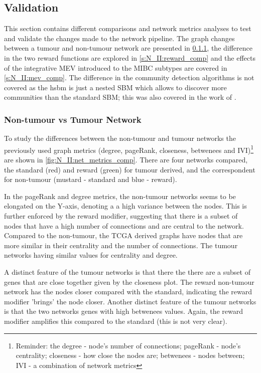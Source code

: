\subsection{Validation} \label{s:N_II:validation}


This section contains different comparisons and network metrics analyses to test and validate the changes made to the network pipeline. The graph changes between a tumour and non-tumour network are presented in \cref{s:N_II:net_comp}, the difference in the two reward functions are explored in \cref{s:N_II:reward_comp} and the effects of the integrative MEV introduced to the MIBC subtypes are covered in \cref{s:N_II:mev_comp}. The difference in the community detection algorithms is not covered as the \acrfull{hsbm} is just a nested SBM which allows to discover more communities than the standard SBM; this was also covered in the work of \citet{Peixoto2014-yb}.


\subsubsection{Non-tumour vs Tumour Network} \label{s:N_II:net_comp}

To study the differences between the non-tumour and tumour networks the previously used graph metrics (degree, pageRank, closeness, betwenees and IVI)\footnote{Reminder: the degree - node's number of connections; pageRank - node's centrality; closeness - how close the nodes are; betwenees - nodes between; IVI - a combination of network metrics} are shown in \cref{fig:N_II:net_metrics_comp}. There are four networks compared, the standard (red) and reward (green) for tumour derived, and the correspondent for non-tumour (mustard - standard and blue - reward).

In the pageRank and degree metrics, the non-tumour networks seems to be elongated on the Y-axis, denoting a a high variance between the nodes. This is further enforced by the reward modifier, suggesting that there is a subset of nodes that have a high number of connections and are central to the network. Compared to the non-tumour, the TCGA derived graphs have nodes that are more similar in their centrality and the number of connections. The tumour networks having similar values for centrality and degree. 

A distinct feature of the tumour networks is that there the there are a subset of genes that are close together given by the closeness plot. The reward non-tumour network has the nodes closer compared with the standard, indicating the reward modifier 'brings' the node closer. Another distinct feature of the tumour networks is that the two networks genes with high betwenees values. Again, the reward modifier amplifies this compared to the standard (this is not very clear).

